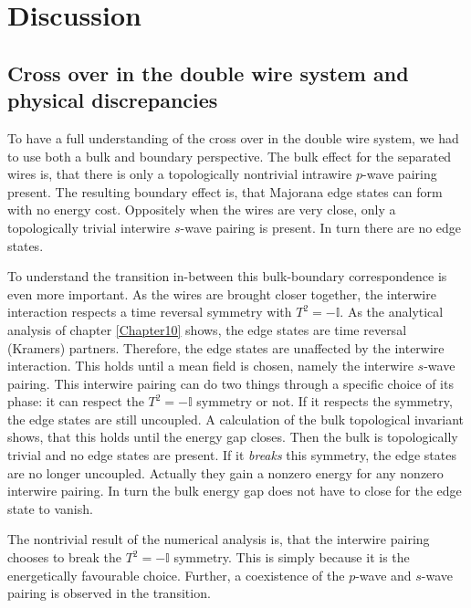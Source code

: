 \chapter{Discussion} 

\label{Chapter14} 

\section{Cross over in the double wire system and physical discrepancies} \label{sec.Discussion.2wires.crossover}
To have a full understanding of the cross over in the double wire system, we had to use both a bulk and boundary perspective. The bulk effect for the separated wires is, that there is only a topologically nontrivial intrawire $p$-wave pairing present. The resulting boundary effect is, that Majorana edge states can form with no energy cost. Oppositely when the wires are very close, only a topologically trivial interwire $s$-wave pairing is present. In turn there are no edge states. 

To understand the transition in-between this bulk-boundary correspondence is even more important. As the wires are brought closer together, the interwire interaction respects a time reversal symmetry with $T^2 = - \mathbb{I}$. As the analytical analysis of chapter \ref{Chapter10} shows, the edge states are time reversal (Kramers) partners. Therefore, the edge states are unaffected by the interwire interaction. This holds until a mean field is chosen, namely the interwire $s$-wave pairing. This interwire pairing can do two things through a specific choice of its phase: it can respect the $T^2 = - \mathbb{I}$ symmetry or not. If it respects the symmetry, the edge states are still uncoupled. A calculation of the bulk topological invariant shows, that this holds until the energy gap closes. Then the bulk is topologically trivial and no edge states are present. If it \textit{breaks} this symmetry, the edge states are no longer uncoupled. Actually they gain a nonzero energy for any nonzero interwire pairing. In turn the bulk energy gap does not have to close for the edge state to vanish. 

The nontrivial result of the numerical analysis is, that the interwire pairing chooses to break the $T^2 = -\mathbb{I}$ symmetry. This is simply because it is the energetically favourable choice. Further, a coexistence of the $p$-wave and $s$-wave pairing is observed in the transition. 


